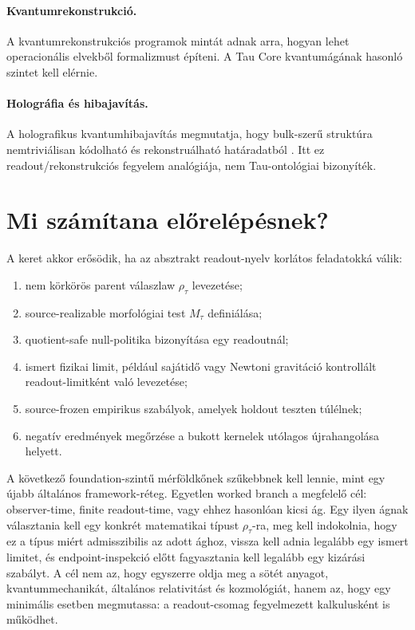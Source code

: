 \documentclass[12pt]{article}
\newcommand{\Rmap}{\rho_{\tau}}
\newcommand{\Mta}{M_{\tau}}
\begin{document}
\paragraph{Kvantumrekonstrukció.}
A kvantumrekonstrukciós programok mintát adnak arra, hogyan lehet operacionális
elvekből formalizmust építeni.  A Tau Core kvantumágának hasonló szintet kell
elérnie.

\paragraph{Holográfia és hibajavítás.}
A holografikus kvantumhibajavítás megmutatja, hogy bulk-szerű struktúra
nemtriviálisan kódolható és rekonstruálható határadatból
\cite{AlmheiriDongHarlow2015}.  Itt ez readout/rekonstrukciós fegyelem analógiája,
nem Tau-ontológiai bizonyíték.

\section{Mi számítana előrelépésnek?}

A keret akkor erősödik, ha az absztrakt readout-nyelv korlátos feladatokká
válik:
\begin{enumerate}[label=(\arabic*)]
  \item nem körkörös parent válaszlaw \(\Rmap\) levezetése;
  \item source-realizable morfológiai test \(\Mta\) definiálása;
  \item quotient-safe null-politika bizonyítása egy readoutnál;
  \item ismert fizikai limit, például sajátidő vagy Newtoni gravitáció
  kontrollált readout-limitként való levezetése;
  \item source-frozen empirikus szabályok, amelyek holdout teszten túlélnek;
  \item negatív eredmények megőrzése a bukott kernelek utólagos újrahangolása
  helyett.
\end{enumerate}

A következő foundation-szintű mérföldkőnek szűkebbnek kell lennie, mint egy
újabb általános framework-réteg.  Egyetlen worked branch a megfelelő cél:
observer-time, finite readout-time, vagy ehhez hasonlóan kicsi ág.  Egy ilyen
ágnak választania kell egy konkrét matematikai típust \(\Rmap\)-ra, meg kell
indokolnia, hogy ez a típus miért admisszibilis az adott ághoz, vissza kell
adnia legalább egy ismert limitet, és endpoint-inspekció előtt fagyasztania
kell legalább egy kizárási szabályt.  A cél nem az, hogy egyszerre oldja meg a
sötét anyagot, kvantummechanikát, általános relativitást és kozmológiát, hanem
az, hogy egy minimális esetben megmutassa: a readout-csomag fegyelmezett
kalkulusként is működhet.
\end{document}

